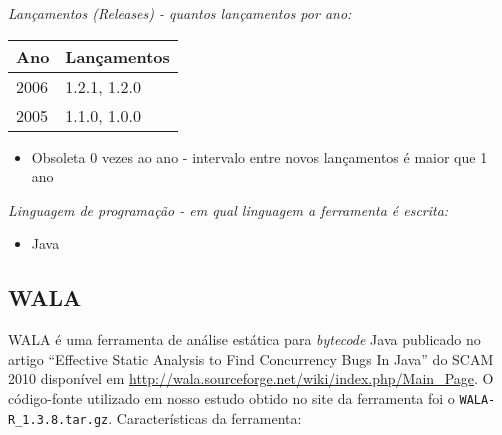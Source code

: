 \begin{description}

  \item {\it Lançamentos ({\it Releases}) - quantos lançamentos por ano:}
    \begin{table}[h!]
      \centering
      \begin{tabular}{| l | l |}
        \hline
        Ano  & Lançamentos  \\
        \hline
        2006 & 1.2.1, 1.2.0 \\
        2005 & 1.1.0, 1.0.0 \\
        \hline
      \end{tabular}
    \end{table}
    \begin{itemize}
      \item Obsoleta $0$ vezes ao ano - intervalo entre novos lançamentos é maior que 1 ano
    \end{itemize}

  \item {\it Linguagem de programação - em qual linguagem a ferramenta é escrita:}
    \begin{itemize}
      \item Java
    \end{itemize}

\end{description}

\subsection{WALA}

WALA é uma ferramenta de análise estática para {\it bytecode} Java publicado
no artigo ``Effective Static Analysis to Find Concurrency Bugs In Java'' do
SCAM 2010 disponível em
\url{http://wala.sourceforge.net/wiki/index.php/Main_Page}. O código-fonte
utilizado em nosso estudo obtido no site da ferramenta foi o
\texttt{WALA-R\_1.3.8.tar.gz}. Características da ferramenta:

